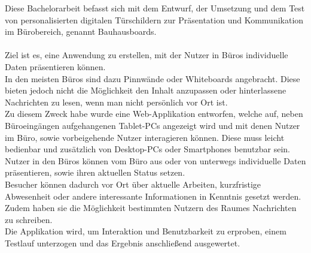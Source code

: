 Diese Bachelorarbeit befasst sich mit dem Entwurf, der Umsetzung und dem Test von personalisierten
digitalen Türschildern zur Präsentation und Kommunikation im Bürobereich, genannt
Bauhausboards.\\\\
Ziel ist es, eine Anwendung zu erstellen, mit der Nutzer in Büros individuelle Daten präsentieren können.\\
In den meisten Büros sind dazu Pinnwände oder Whiteboards angebracht. Diese bieten jedoch nicht die Möglichkeit den Inhalt anzupassen oder hinterlassene Nachrichten zu lesen, wenn man nicht persönlich vor Ort ist.\\
Zu diesem Zweck habe wurde eine Web-Applikation entworfen, welche auf, neben Büroeingängen aufgehangenen Tablet-PCs angezeigt wird und mit denen Nutzer im Büro, sowie vorbeigehende Nutzer interagieren können.
Diese muss leicht bedienbar und zusätzlich von Desktop-PCs oder Smartphones benutzbar sein.\\
Nutzer in den Büros können vom Büro aus oder von unterwegs individuelle Daten präsentieren, sowie ihren aktuellen Status setzen.\\
Besucher können dadurch vor Ort über aktuelle Arbeiten, kurzfristige Abwesenheit oder andere interessante Informationen in Kenntnis gesetzt werden. Zudem haben sie die Möglichkeit bestimmten Nutzern des Raumes Nachrichten zu schreiben.\\
Die Applikation wird, um Interaktion und Benutzbarkeit zu erproben, einem Testlauf unterzogen und das Ergebnis anschließend ausgewertet.


